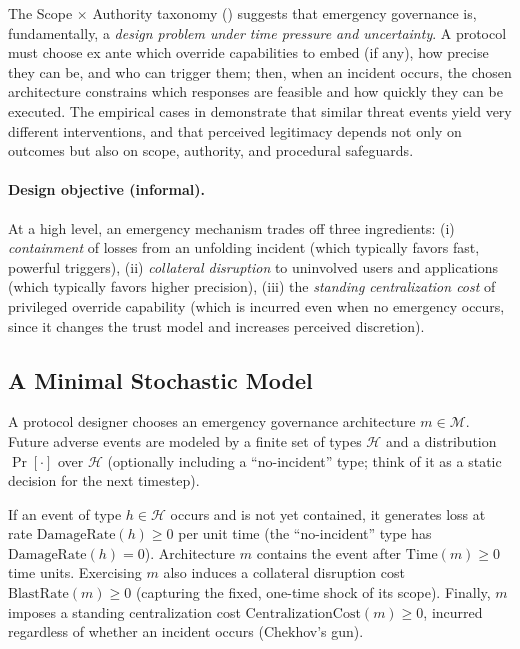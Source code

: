 \documentclass[12pt]{article}
\begin{document}
The Scope $\times$ Authority taxonomy () suggests that emergency governance is, fundamentally,
a \emph{design problem under time pressure and uncertainty}.
A protocol must choose ex ante which override capabilities to embed (if any), how precise they can be, and who can trigger them;
then, when an incident occurs, the chosen architecture constrains which responses are feasible and how quickly they can be executed.
The empirical cases in  demonstrate that similar threat events yield very different interventions, and that perceived legitimacy depends not only on outcomes but also on scope, authority, and procedural safeguards.

\paragraph{Design objective (informal).}
At a high level, an emergency mechanism trades off three ingredients:
(i) \emph{containment} of losses from an unfolding incident (which typically favors fast, powerful triggers),
(ii) \emph{collateral disruption} to uninvolved users and applications (which typically favors higher precision),
(iii) the \emph{standing centralization cost} of privileged override capability (which is incurred even when no emergency occurs,
since it changes the trust model and increases perceived discretion).


\subsection{A Minimal Stochastic Model}

\newcommand{\Events}{\mathcal{H}}          
\newcommand{\Prob}{\Pr}                    
\newcommand{\Time}{\mathrm{Time}}          
\newcommand{\DamageRate}{\mathrm{DamageRate}} 
\newcommand{\BlastRate}{\mathrm{BlastRate}}   
\newcommand{\CentralizationCost}{\mathrm{CentralizationCost}} \newcommand{\ExpectedCost}{\mathrm{ExpectedCost}}

A protocol designer chooses an emergency governance architecture $m\in\mathcal{M}$.
Future adverse events are modeled by a finite set of types $\Events$ and a distribution $\Prob[\cdot]$ over $\Events$
(optionally including a ``no-incident'' type; think of it as a static decision for the next timestep).

If an event of type $h\in\Events$ occurs and is not yet contained, it generates loss at rate $\DamageRate(h)\ge 0$ per unit time (the ``no-incident'' type has $\DamageRate(h) = 0$). Architecture $m$ contains the event after $\Time(m)\ge 0$ time units. Exercising $m$ also induces a collateral disruption cost $\BlastRate(m)\ge 0$ (capturing the fixed, one-time shock of its scope). Finally, $m$ imposes a standing centralization cost $\CentralizationCost(m)\ge 0$, incurred regardless of whether an incident occurs (Chekhov's gun).
\end{document}
